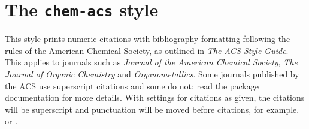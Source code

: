 \documentclass[a4paper]{article}
\begin{document}
\section*{The \texttt{chem-acs} style}

This style prints numeric citations with bibliography
formatting following the rules of the American Chemical Society,
as outlined in \emph{The ACS Style Guide}.
This applies to journals such as \emph{Journal of the American
Chemical Society}, \emph{The Journal of Organic Chemistry}
and \emph{Organometallics}.  Some journals published by the ACS
use superscript citations and some do not: read the package
documentation for more details. With settings for citations as 
given, the citations will be superscript and punctuation will be
moved before citations, for example. or
\autocite{Arduengo1991}.

\nocite{*}

\printbibliography
\end{document}
